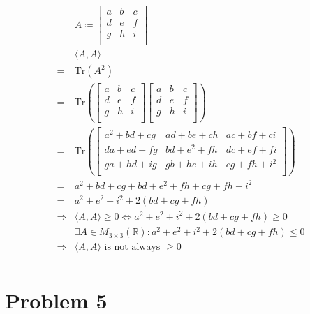 \documentclass{article}
\def\R{\mathbb{R}}
\begin{document}
\begin{equation*}
    \begin{split}
        &A\coloneqq\begin{bmatrix}
            a&b&c\\
            d&e&f\\
            g&h&i\\
        \end{bmatrix}\\
        &\langle A,A\rangle\\
        =&\text{Tr}(A^2)\\
        =&\text{Tr}(\begin{bmatrix}
            a&b&c\\
            d&e&f\\
            g&h&i\\
        \end{bmatrix}\begin{bmatrix}
            a&b&c\\
            d&e&f\\
            g&h&i\\
        \end{bmatrix})\\
        =&\text{Tr}(\begin{bmatrix}
            a^2+bd+cg&ad+be+ch&ac+bf+ci\\
            da+ed+fg&bd+e^2+fh&dc+ef+fi\\
            ga+hd+ig&gb+he+ih&cg+fh+i^2\\
        \end{bmatrix})\\
        =&a^2+bd+cg+bd+e^2+fh+cg+fh+i^2\\
        =&a^2+e^2+i^2+2(bd+cg+fh)\\
        \Rightarrow&\langle A,A\rangle\geq 0\Leftrightarrow a^2+e^2+i^2+2(bd+cg+fh)\geq0\\
        &\exists A\in M_{3\times3}(\R):a^2+e^2+i^2+2(bd+cg+fh)\leq0\\
        \Rightarrow&\langle A,A\rangle\text{ is not always }\geq 0\\
    \end{split}
\end{equation*}

\newpage

\section{Problem 5}
\end{document}
